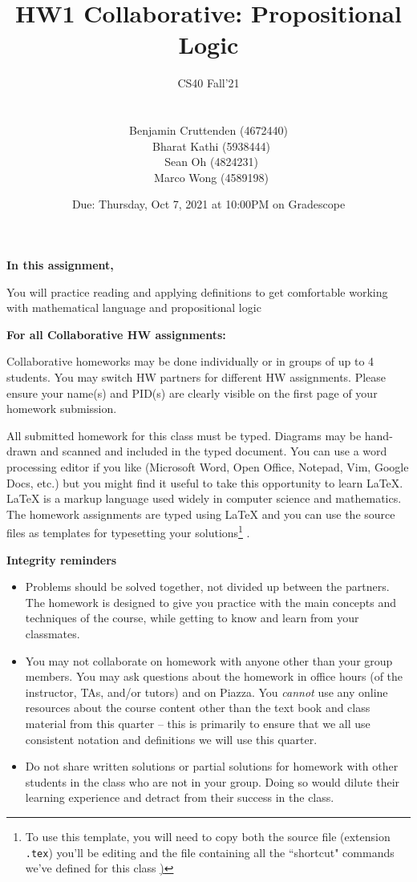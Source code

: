 \documentclass[12pt, oneside]{article}
\title{HW1 Collaborative: Propositional Logic}
\author{CS40 Fall'21\\\\\\
Benjamin Cruttenden (4672440)\\\
Bharat Kathi (5938444)\\\
Sean Oh (4824231)\\\
Marco Wong (4589198)}
\date{Due: Thursday, Oct 7, 2021 at 10:00PM on Gradescope}
\begin{document}
\maketitle

{\bf In this assignment,}

You will practice reading and
applying definitions to get comfortable working with mathematical language and propositional logic

{\bf For all Collaborative HW assignments:}

Collaborative homeworks may be done individually or in groups of up to 4 students. You may switch HW partners for different HW assignments.  Please ensure your name(s) and PID(s) are clearly visible on the first page of your homework submission.

All submitted homework for this class must be typed. Diagrams may be hand-drawn and scanned and included in the typed document. You can use a word processing editor if you like (Microsoft Word, Open Office, Notepad, Vim, Google Docs, etc.) but you might find it useful to take this opportunity to learn LaTeX. LaTeX is a markup language used widely in computer science and mathematics. The homework assignments are typed using LaTeX and you can use the source files as templates for typesetting your solutions\footnote{To use this template, you will need to copy both the source file (extension \texttt{.tex})  you'll be editing
and the file containing all the ``shortcut" commands we've defined for this class \href{https://drive.google.com/file/d/1FmQvgByKnNjTpIkAUw31TGWYrQZM-HK0/view?usp=sharing})} .


{\bf Integrity reminders}
\begin{itemize}
\item Problems should be solved together, not divided up between the partners. The homework is
designed to give you practice with the main concepts and techniques of the course, while getting to know and learn from your classmates.
\item You may not collaborate on homework with anyone other than your group members.
You may ask questions about the homework in office hours (of the instructor, TAs, and/or tutors) and 
on Piazza.  You \emph{cannot} use any online resources about the course content other than the text
book and class material from this quarter -- this is primarily to ensure that we all use consistent notation and
definitions we will use this quarter.
\item Do not share written solutions or partial solutions for homework with other students in the class who are not in your group. Doing so would dilute their learning experience and detract from their success in the class.
\end{itemize}
\end{document}
